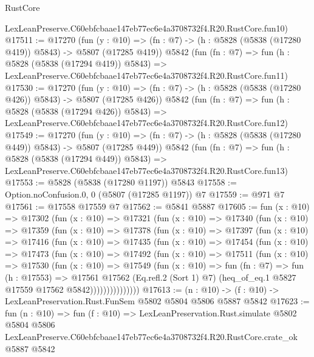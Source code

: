 \begin{lexlean}{RustCore}
\begin{coremodule}
    LexLeanPreserve.C60ebfcbaae147eb77ec6e4a3708732f4.R20.RustCore.fun10)
@17511 := @17270
    (fun (y : @10) => (fn : @7) -> (h : @5828 (@5838 (@17280 @419)) @5843) -> @5807 (@17285 @419))
    @5842
    (fun (fn : @7) =>
    fun (h : @5828 (@5838 (@17294 @419)) @5843) =>
    LexLeanPreserve.C60ebfcbaae147eb77ec6e4a3708732f4.R20.RustCore.fun11)
@17530 := @17270
    (fun (y : @10) => (fn : @7) -> (h : @5828 (@5838 (@17280 @426)) @5843) -> @5807 (@17285 @426))
    @5842
    (fun (fn : @7) =>
    fun (h : @5828 (@5838 (@17294 @426)) @5843) =>
    LexLeanPreserve.C60ebfcbaae147eb77ec6e4a3708732f4.R20.RustCore.fun12)
@17549 := @17270
    (fun (y : @10) => (fn : @7) -> (h : @5828 (@5838 (@17280 @449)) @5843) -> @5807 (@17285 @449))
    @5842
    (fun (fn : @7) =>
    fun (h : @5828 (@5838 (@17294 @449)) @5843) =>
    LexLeanPreserve.C60ebfcbaae147eb77ec6e4a3708732f4.R20.RustCore.fun13)
@17553 := @5828 (@5838 (@17280 @1197)) @5843
@17558 := Option.noConfusion.{0, 0} (@5807 (@17285 @1197)) @7
@17559 := @971 @7
@17561 := @17558 @17559 @7
@17562 := @5841 @5887
@17605 := fun (x : @10) =>
  @17302
    (fun (x : @10) =>
    @17321
      (fun (x : @10) =>
      @17340
        (fun (x : @10) =>
        @17359
          (fun (x : @10) =>
          @17378
            (fun (x : @10) =>
            @17397
              (fun (x : @10) =>
              @17416
                (fun (x : @10) =>
                @17435
                  (fun (x : @10) =>
                  @17454
                    (fun (x : @10) =>
                    @17473
                      (fun (x : @10) =>
                      @17492
                        (fun (x : @10) =>
                        @17511
                          (fun (x : @10) =>
                          @17530
                            (fun (x : @10) =>
                            @17549
                              (fun (x : @10) =>
                              fun (fn : @7) =>
                              fun (h : @17553) =>
                              @17561
                                @17562
                                (Eq.refl.{2} (Sort 1) @7)
                                (heq_of_eq.{1} @5827 @17559 @17562 @5842)))))))))))))))
@17613 := (n : @10) -> (f : @10) -> LexLeanPreservation.Rust.FunSem @5802 @5804 @5806 @5887 @5842
@17623 := fun (n : @10) =>
  fun (f : @10) =>
  LexLeanPreservation.Rust.simulate
    @5802
    @5804
    @5806
    LexLeanPreserve.C60ebfcbaae147eb77ec6e4a3708732f4.R20.RustCore.crate_ok
    @5887
    @5842
\end{coremodule}
\end{lexlean}
